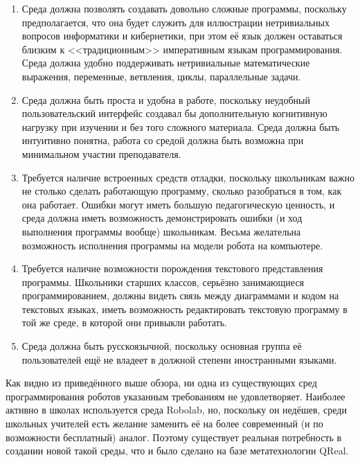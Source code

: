 \begin{enumerate}
	\item Среда должна позволять создавать довольно сложные программы, поскольку предполагается, 
		что она будет служить для иллюстрации нетривиальных вопросов информатики и кибернетики, 
		при этом её язык должен оставаться близким к <<традиционным>> императивным языкам 
		программирования. Среда должна удобно поддерживать нетривиальные математические 
		выражения, переменные, ветвления, циклы, параллельные задачи.
	\item Среда должна быть проста и удобна в работе, поскольку неудобный пользовательский 
		интерфейс создавал бы дополнительную когнитивную нагрузку при изучении и без того 
		сложного материала. Среда должна быть интуитивно понятна, работа со средой должна 
		быть возможна при минимальном участии преподавателя.
	\item Требуется наличие встроенных средств отладки, поскольку школьникам важно не 
		столько сделать работающую программу, сколько разобраться в том, как она работает. 
		Ошибки могут иметь большую педагогическую ценность, и среда должна иметь возможность 
		демонстрировать ошибки (и ход выполнения программы вообще) школьникам. Весьма желательна 
		возможность исполнения программы на модели робота на компьютере.
	\item Требуется наличие возможности порождения текстового представления программы. 
		Школьники старших классов, серьёзно занимающиеся программированием, должны видеть 
		связь между диаграммами и кодом на текстовых языках, иметь возможность редактировать 
		текстовую программу в той же среде, в которой они привыкли работать.
	\item Среда должна быть русскоязычной, поскольку основная группа её пользователей 
		ещё не владеет в должной степени иностранными языками.
\end{enumerate}

Как видно из приведённого выше обзора, ни одна из существующих сред программирования 
роботов указанным требованиям не удовлетворяет. Наиболее активно в школах используется 
среда Robolab, но, поскольку он недёшев, среди школьных учителей есть желание заменить 
её на более современный (и по возможности бесплатный) аналог. Поэтому существует реальная 
потребность в создании новой такой среды, что и было сделано на базе метатехнологии QReal.

